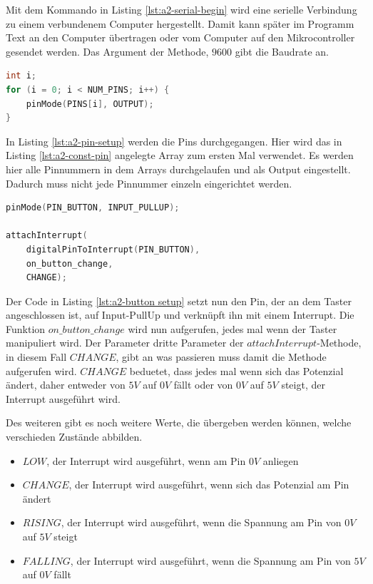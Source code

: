 Mit dem Kommando in Listing \ref{lst:a2-serial-begin} wird eine serielle Verbindung zu einem verbundenem Computer hergestellt.
Damit kann später im Programm Text an den Computer übertragen oder vom Computer auf den Mikrocontroller gesendet werden.
Das Argument der Methode, $9600$ gibt die Baudrate an.

\begin{lstlisting}[language=C,label={lst:a2-pin-setup}, caption={Konfiguration der Pins}]
int i;
for (i = 0; i < NUM_PINS; i++) {
    pinMode(PINS[i], OUTPUT);
}
\end{lstlisting}

In Listing \ref{lst:a2-pin-setup} werden die Pins durchgegangen.
Hier wird das in Listing \ref{lst:a2-const-pin} angelegte Array zum ersten Mal verwendet.
Es werden hier alle Pinnummern in dem Arrays durchgelaufen und als Output eingestellt.
Dadurch muss nicht jede Pinnummer einzeln eingerichtet werden.

\newpage

\begin{lstlisting}[language=C,label={lst:a2-button setup}, caption={Einstellen des Buttons}]
pinMode(PIN_BUTTON, INPUT_PULLUP);

attachInterrupt(
    digitalPinToInterrupt(PIN_BUTTON),
    on_button_change,
    CHANGE);
\end{lstlisting}

Der Code in Listing \ref{lst:a2-button setup} setzt nun den Pin, der an dem Taster angeschlossen ist, auf Input-PullUp und verknüpft ihn mit einem Interrupt.
Die Funktion $on\_button\_change$ wird nun aufgerufen, jedes mal wenn der Taster manipuliert wird.
Der Parameter dritte Parameter der $attachInterrupt$-Methode, in diesem Fall $CHANGE$, gibt an was passieren muss damit die Methode aufgerufen wird.
$CHANGE$ beduetet, dass jedes mal wenn sich das Potenzial ändert, daher entweder von $5V$ auf $0V$ fällt oder von $0V$ auf $5V$ steigt, der Interrupt ausgeführt wird.

Des weiteren gibt es noch weitere Werte, die übergeben werden können, welche verschieden Zustände abbilden.

\begin{itemize}
    \item $LOW$, der Interrupt wird ausgeführt, wenn am Pin $0V$ anliegen
    \item $CHANGE$, der Interrupt wird ausgeführt, wenn sich das Potenzial am Pin ändert
    \item $RISING$, der Interrupt wird ausgeführt, wenn die Spannung am Pin von $0V$ auf $5V$ steigt
    \item $FALLING$, der Interrupt wird ausgeführt, wenn die Spannung am Pin von $5V$ auf $0V$ fällt
\end{itemize}

